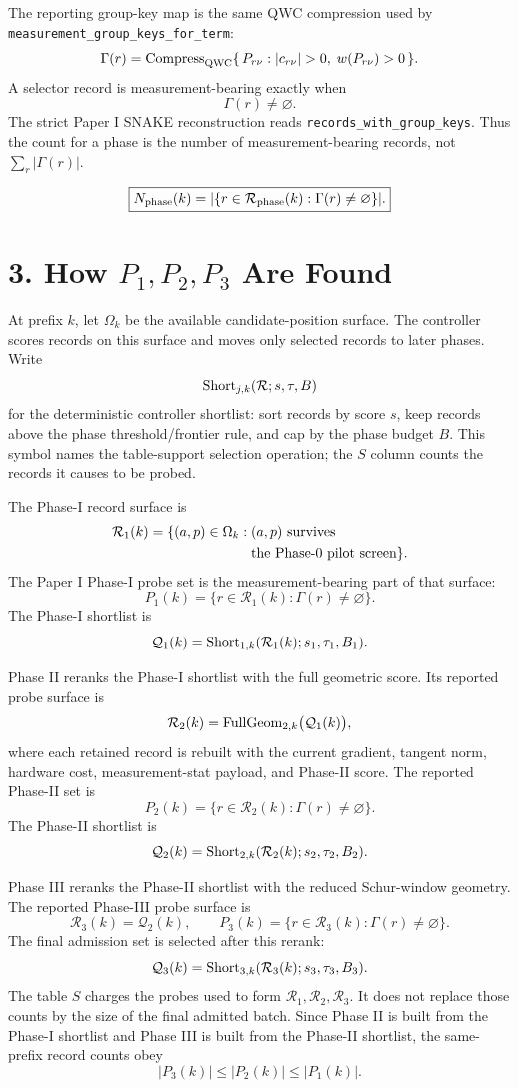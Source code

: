 \documentclass[10pt,twocolumn]{article}
\newcommand{\Qcal}{\mathcal Q}
\newcommand{\Rcal}{\mathcal R}
\begin{document}
The reporting group-key map is the same QWC compression used by
\texttt{measurement\_group\_keys\_for\_term}:
\[
  \Gamma(r)
  =
  {\rm Compress}_{\rm QWC}
  \{\,P_{r\nu}: |c_{r\nu}|>0,\; w(P_{r\nu})>0\,\}.
\]
A selector record is measurement-bearing exactly when
\[
  \Gamma(r)\ne\varnothing .
\]
The strict Paper I SNAKE reconstruction reads
\texttt{records\_with\_group\_keys}.  Thus the count for a phase is the number
of measurement-bearing records, not \(\sum_r|\Gamma(r)|\).

\[
\boxed{
  N_{\rm phase}(k)
  =
  |\{r\in\Rcal_{\rm phase}(k):\Gamma(r)\ne\varnothing\}|.
}
\]

\section*{3. How \(P_1,P_2,P_3\) Are Found}

At prefix \(k\), let \(\Omega_k\) be the available candidate-position surface.
The controller scores records on this surface and moves only selected records
to later phases.  Write
\[
  {\rm Short}_{j,k}(\Rcal;s,\tau,B)
\]
for the deterministic controller shortlist: sort records by score \(s\), keep
records above the phase threshold/frontier rule, and cap by the phase budget
\(B\).  This symbol names the table-support selection operation; the \(S\)
column counts the records it causes to be probed.

The Phase-I record surface is
\[
  \begin{aligned}
  \Rcal_1(k)
  =
  \{(a,p)\in\Omega_k:\;&
  (a,p)\hbox{ survives}\\
  &\hbox{the Phase-0 pilot screen}\}.
  \end{aligned}
\]
The Paper I Phase-I probe set is the measurement-bearing part of that surface:
\[
  P_1(k)=\{r\in\Rcal_1(k):\Gamma(r)\ne\varnothing\}.
\]
The Phase-I shortlist is
\[
  \Qcal_1(k)
  =
  {\rm Short}_{1,k}(\Rcal_1(k);s_1,\tau_1,B_1).
\]

Phase II reranks the Phase-I shortlist with the full geometric score.  Its
reported probe surface is
\[
  \Rcal_2(k)
  =
  {\rm FullGeom}_{2,k}\bigl(\Qcal_1(k)\bigr),
\]
where each retained record is rebuilt with the current gradient, tangent norm,
hardware cost, measurement-stat payload, and Phase-II score.  The reported
Phase-II set is
\[
  P_2(k)=\{r\in\Rcal_2(k):\Gamma(r)\ne\varnothing\}.
\]
The Phase-II shortlist is
\[
  \Qcal_2(k)
  =
  {\rm Short}_{2,k}(\Rcal_2(k);s_2,\tau_2,B_2).
\]

Phase III reranks the Phase-II shortlist with the reduced Schur-window
geometry.  The reported Phase-III probe surface is
\[
  \Rcal_3(k)=\Qcal_2(k),
  \qquad
  P_3(k)=\{r\in\Rcal_3(k):\Gamma(r)\ne\varnothing\}.
\]
The final admission set is selected after this rerank:
\[
  \Qcal_3(k)
  =
  {\rm Short}_{3,k}(\Rcal_3(k);s_3,\tau_3,B_3).
\]
The table \(S\) charges the probes used to form \(\Rcal_1,\Rcal_2,\Rcal_3\).
It does not replace those counts by the size of the final admitted batch.
Since Phase II is built from the Phase-I shortlist and Phase III is built from
the Phase-II shortlist, the same-prefix record counts obey
\[
  |P_3(k)|\le |P_2(k)|\le |P_1(k)|.
\]
\end{document}
